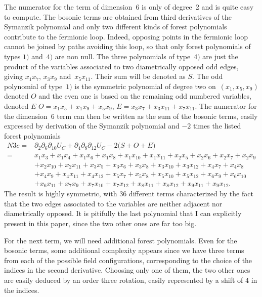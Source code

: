 \documentclass[pdftex]{sigma}
\numberwithin{equation}{section}
\begin{document}
The numerator for the term of dimension~6 is only of degree~2 and is quite easy to compute. The bosonic terms are obtained
from third derivatives of the Symanzik polynomial and only two different kinds of forest polynomials contribute to the
fermionic loop. Indeed, opposing points in the fermionic loop cannot be joined by paths avoiding this loop, so that only
forest polynomials of types $1)$ and~$4)$ are non null. The three polynomials of type~$4)$ are just the product of
the variables associated to two diametrically opposed odd edges, giving $x_1 x_7$, $x_3 x_9$ and~$x_5 x_{11}$. Their
sum will be denoted as $S$. The odd polynomial of type~$1)$ is the symmetric polynomial of degree two
on~$(x_1,x_5,x_9)$ denoted $O$ and the even one is based on the remaining odd numbered variables, denoted $E$
$O = x_1 x_5 + x_1 x_9 + x_5 x_9$, $
	E = x_3 x_7 + x_3 x_{11} + x_7 x_{11}$.
The numerator for the dimension~6 term can then be written as the sum of the bosonic terms, easily expressed by derivation
of the Symanzik polynomial and $-2$ times the listed forest polynomials
\begin{align*}
	N3c ={}& \partial_2 \partial_6 \partial_{10} U_C + \partial_4 \partial_8 \partial_{12} U_C
		- 2 \bigl( S + O + E \bigr) \\
		={}& x_1 x_3 +x_1 x_4 +x_1 x_6 +x_1 x_8 +x_1 x_{10} +x_1 x_{11} +x_2 x_5 +x_2 x_6 +x_2 x_7 +x_2 x_9 \\
		& +x_2 x_{10} +x_2 x_{11} +x_3 x_5 +x_3 x_6 +x_3 x_8 +x_3 x_{10} +x_3 x_{12} +x_4 x_7 +x_4 x_8 \\
		& +x_4 x_9 +x_4 x_{11} +x_4 x_{12} +x_5 x_7 +x_5 x_8 +x_5 x_{10} +x_5 x_{12} +x_6 x_9 +x_6 x_{10} \\
		& +x_6 x_{11} +x_7 x_9 +x_7 x_{10} +x_7 x_{12} +x_8 x_{11} +x_8 x_{12} +x_9 x_{11} +x_9 x_{12}.
\end{align*}
The result is highly symmetric, with 36 different terms characterized by the fact that the two edges associated to the
variables are neither adjacent nor diametrically opposed. It is pitifully the last polynomial that I can explicitly
present in this paper, since the two other ones are far too big.

For the next term, we will need additional forest polynomials. Even for the bosonic terms, some additional complexity
appears since we have three terms from each of the possible field configurations, corresponding to the choice of the
indices in the second derivative. Choosing only one of them, the two other ones are easily deduced by an order three
rotation, easily represented by a shift of 4 in the indices.
\end{document}
